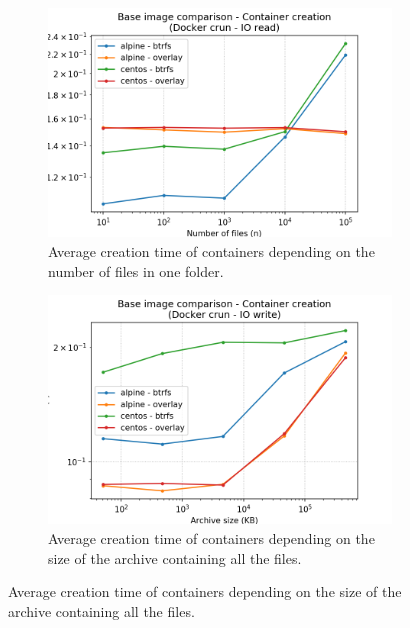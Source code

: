 \begin{figure}[!h]
    \begin{subfigure}{.5\textwidth}
      \centering
      \includegraphics[width=\linewidth]{images/image/image-creation-Docker-crun---IO-read.png}
      \caption{Average creation time of containers depending on the number of files in one folder.}
      \label{fig:image:io-read-create}
    \end{subfigure}
    \begin{subfigure}{.5\textwidth}
      \centering
      \includegraphics[width=\linewidth]{images/image/image-creation-Docker-crun---IO-write.png}
      \caption{Average creation time of containers depending on the size of the archive containing all the files.}
      \label{fig:image:io-write-create}
    \end{subfigure}
    
    

\end{figure}
